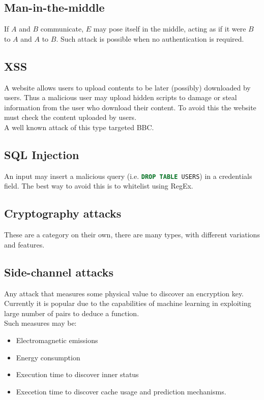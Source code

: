 \subsection*{Man-in-the-middle}
If $A$ and $B$ communicate, $E$ may pose itself in the middle, acting as if it were $B$ to $A$ and $A$ to $B$.
Such attack is possible when no authentication is required.

\subsection*{XSS}
A website allows users to upload contents to be later (possibly) downloaded by users.
Thus a malicious user may upload hidden scripts to damage or steal information from the user who download their content.
To avoid this the website must check the content uploaded by users.\\
A well known attack of this type targeted BBC.

\subsection*{SQL Injection}
An input may insert a malicious query (i.e. \lstinline[language=SQL]{DROP TABLE USERS}) in a credentials field.
The best way to avoid this is to whitelist using RegEx.

\subsection*{Cryptography attacks}
These are a category on their own, there are many types, with different variations and features.

\subsection*{Side-channel attacks}
Any attack that measures some physical value to discover an encryption key.
Currently it is popular due to the capabilities of machine learning in exploiting large number of pairs to deduce a function.\\
Such measures may be:
\begin{itemize}
    \item Electromagnetic emissions
    \item Energy consumption
    \item Execution time to discover inner status
    \item Execetion time to discover cache usage and prediction mechanisms.
\end{itemize}

